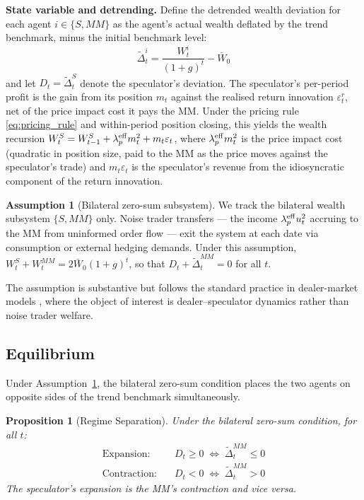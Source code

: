\documentclass[12pt,a4paper]{article}
\newtheorem{proposition}[theorem]{Proposition}
\theoremstyle{definition}
\newtheorem{assumption}[theorem]{Assumption}
\begin{document}
\noindent\textbf{State variable and detrending.}
Define the detrended wealth deviation for each agent $i \in \{S, MM\}$
as the agent's actual wealth deflated by the trend benchmark, minus the
initial benchmark level:
\begin{equation}
  \tilde{\Delta}^i_t = \frac{W^i_t}{(1+g)^t} - \bar{W}_0
  \label{eq:deviation_def}
\end{equation}
and let $D_t = \tilde{\Delta}^S_t$ denote the speculator's deviation.
The speculator's per-period profit is the gain from its position $m_t$
against the realised return innovation $\varepsilon^r_t$, net of the
price impact cost it pays the MM. Under the pricing rule
\eqref{eq:pricing_rule} and within-period position closing, this yields
the wealth recursion $W^S_t = W^S_{t-1} + \lambda^{\rm eff}_p m^2_t +
m_t\varepsilon_t$, where $\lambda^{\rm eff}_p m^2_t$ is the price
impact cost (quadratic in position size, paid to the MM as the price
moves against the speculator's trade) and $m_t\varepsilon_t$ is the
speculator's revenue from the idiosyncratic component of the return
innovation.

\begin{assumption}[Bilateral zero-sum subsystem]
\label{ass:zerosum}
We track the bilateral wealth subsystem $\{S, MM\}$ only. Noise trader
transfers --- the income $\lambda^{\rm eff}_p u^2_t$ accruing to the
MM from uninformed order flow --- exit the system at each date via
consumption or external hedging demands. Under this assumption,
$W^S_t + W^{MM}_t = 2\bar{W}_0(1+g)^t$, so that
$D_t + \tilde{\Delta}^{MM}_t = 0$ for all $t$.
\end{assumption}

\noindent
The assumption is substantive but follows the standard practice in
dealer-market models \citep{kyle1985,glosten1985,brunnermeier2009},
where the object of interest is dealer--speculator dynamics rather than
noise trader welfare.


\subsection{Equilibrium}
\label{sec:equilibrium}

Under Assumption~\ref{ass:zerosum}, the bilateral zero-sum condition
places the two agents on opposite sides of the trend benchmark
simultaneously.

\begin{proposition}[Regime Separation]
\label{prop:regime_separation}
Under the bilateral zero-sum condition, for all $t$:
\begin{align}
  \text{Expansion:} & \quad D_t \geq 0 \;\Leftrightarrow\;
    \tilde{\Delta}^{MM}_t \leq 0 \\
  \text{Contraction:} & \quad D_t < 0 \;\Leftrightarrow\;
    \tilde{\Delta}^{MM}_t > 0
\end{align}
The speculator's expansion is the MM's contraction and vice versa.
\end{proposition}
\end{document}

